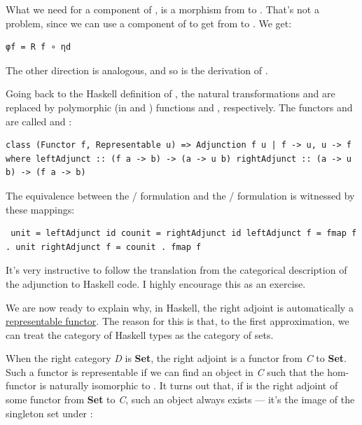 What we need for a component of , is a morphism from
 to . That's not a problem, since we can use a
component of  to get from  to
. We get:

\begin{verbatim}
φf = R f ∘ ηd
\end{verbatim}

The other direction is analogous, and so is the derivation of
.

Going back to the Haskell definition of , the natural
transformations  and  are replaced by polymorphic
(in  and ) functions  and
, respectively. The functors  and
 are called  and :

\begin{verbatim}
class (Functor f, Representable u) => Adjunction f u | f -> u, u -> f where leftAdjunct :: (f a -> b) -> (a -> u b) rightAdjunct :: (a -> u b) -> (f a -> b) 
\end{verbatim}

The equivalence between the / formulation
and the / formulation is
witnessed by these mappings:

\begin{verbatim}
 unit = leftAdjunct id counit = rightAdjunct id leftAdjunct f = fmap f . unit rightAdjunct f = counit . fmap f 
\end{verbatim}

It's very instructive to follow the translation from the categorical
description of the adjunction to Haskell code. I highly encourage this
as an exercise.

We are now ready to explain why, in Haskell, the right adjoint is
automatically a
\href{https://bartoszmilewski.com/2015/07/29/representable-functors/}{representable
functor}. The reason for this is that, to the first approximation, we
can treat the category of Haskell types as the category of sets.

When the right category \emph{D} is \textbf{Set}, the right adjoint
 is a functor from \emph{C} to \textbf{Set}. Such a functor is
representable if we can find an object  in \emph{C} such
that the hom-functor  is naturally isomorphic to
. It turns out that, if  is the right adjoint of
some functor  from \textbf{Set} to \emph{C}, such an object
always exists --- it's the image of the singleton set \code{()} under
:

